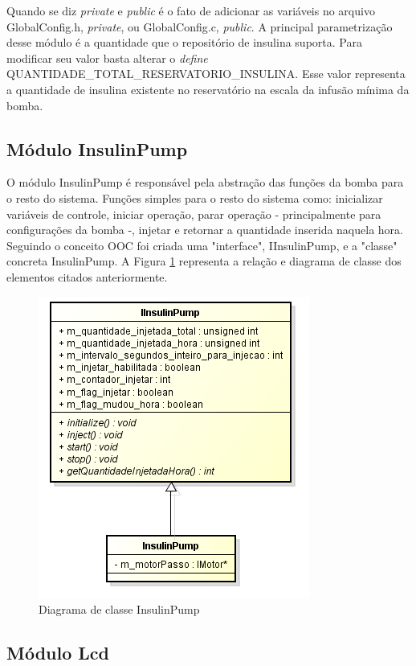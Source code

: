 Quando se diz \emph{private} e \emph{public} é o fato de adicionar as variáveis no arquivo GlobalConfig.h, \emph{private}, ou GlobalConfig.c, \emph{public}. A principal parametrização desse módulo é a quantidade que o repositório de insulina suporta. Para modificar seu valor basta alterar o \emph{define} QUANTIDADE\_TOTAL\_RESERVATORIO\_INSULINA. Esse valor representa a quantidade de insulina existente no reservatório na escala da infusão mínima da bomba.

\subsection{Módulo InsulinPump}

O módulo InsulinPump é responsável pela abstração das funções da bomba para o resto do sistema. Funções simples para o resto do sistema como: inicializar variáveis de controle, iniciar operação, parar operação - principalmente para configurações da bomba -, injetar e retornar a quantidade inserida naquela hora. Seguindo o conceito OOC foi criada uma "interface", IInsulinPump, e a "classe" concreta InsulinPump. A Figura \ref{fig:diagramainsulinpump} representa a relação e diagrama de classe dos elementos citados anteriormente.

\begin{figure}[htp]
	\centering
	\includegraphics[scale=1]{images/classe_insulinpump.png}
	\caption{Diagrama de classe InsulinPump}	
	\label{fig:diagramainsulinpump}
\end{figure}

\subsection{Módulo Lcd}

